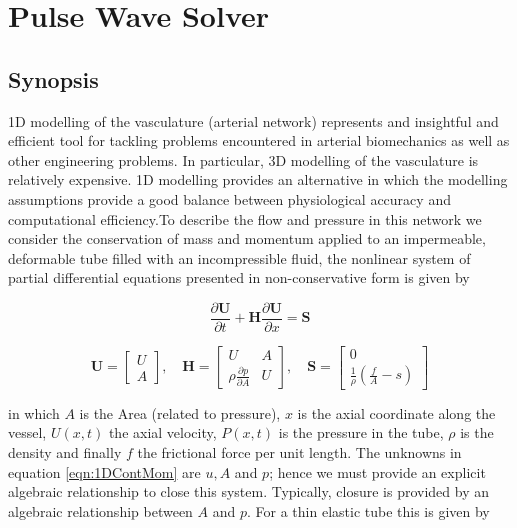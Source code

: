 \chapter{Pulse Wave Solver}

\section{Synopsis}

1D modelling of the vasculature (arterial network) represents and insightful and efficient tool for tackling problems encountered in arterial biomechanics as well as other engineering problems. In particular, 3D modelling of the vasculature is relatively expensive. 1D modelling provides an alternative in which the modelling assumptions provide a good balance between physiological accuracy and computational efficiency.To describe the flow and pressure in this network we consider the conservation of mass and momentum applied to an impermeable, deformable tube filled with an incompressible fluid, the nonlinear system of partial differential equations presented in non-conservative form is given by

\begin{equation}
\frac{\partial \mathbf{U}}{\partial{t}} + \mathbf{H}\frac{\partial{\mathbf{U}}}{\partial{x}} 
= \mathbf{S}
\label{eqn:1DContMom}
\end{equation}

\begin{equation}
\mathbf{U}=\begin{bmatrix} U \\ A \end{bmatrix}, \quad \mathbf{H}=\begin{bmatrix} U & A \\ \rho\frac{\partial{p}}{\partial{A}} & U\end{bmatrix}, \quad \mathbf{S}=\begin{bmatrix} 0 \\ \frac{1}{\rho}\left(\frac{f}{A}-s\right) \end{bmatrix} \nonumber
\end{equation}

in which $A$ is the Area (related to pressure), $x$ is the axial coordinate along the vessel, $U(x,t)$ the axial velocity, $P(x,t)$ is the pressure in the tube,  $\rho$ is the density and finally $f$ the frictional force per unit length. The unknowns in equation \ref{eqn:1DContMom} are $u, A$ and $p$; hence we must provide an explicit algebraic relationship to close this system. Typically, closure is provided by an algebraic relationship between $A$ and $p$. For a thin elastic tube this is given by

